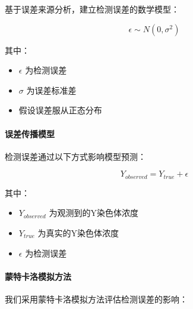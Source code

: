 \documentclass[12pt,a4paper]{ctexart}
\numberwithin{equation}{section}
\theoremstyle{mcm}
\begin{document}
基于误差来源分析，建立检测误差的数学模型：

\begin{equation}
\epsilon \sim N(0, \sigma^2)
\end{equation}

其中：
\begin{itemize}
    \item $\epsilon$ 为检测误差
    \item $\sigma$ 为误差标准差
    \item 假设误差服从正态分布
\end{itemize}

\paragraph{误差传播模型}

检测误差通过以下方式影响模型预测：

\begin{equation}
Y_{observed} = Y_{true} + \epsilon
\end{equation}

其中：
\begin{itemize}
    \item $Y_{observed}$ 为观测到的Y染色体浓度
    \item $Y_{true}$ 为真实的Y染色体浓度
    \item $\epsilon$ 为检测误差
\end{itemize}

\paragraph{蒙特卡洛模拟方法}

我们采用蒙特卡洛模拟方法评估检测误差的影响：
\end{document}
